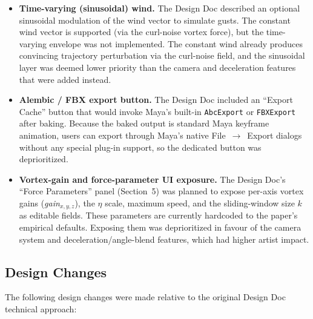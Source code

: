 \documentclass[12pt]{article}
\begin{document}
\begin{itemize}
  \item \textbf{Time-varying (sinusoidal) wind.} The Design Doc described an
    optional sinusoidal modulation of the wind vector to simulate gusts. The
    constant wind vector is supported (via the curl-noise vortex force), but
    the time-varying envelope was not implemented. The constant wind already
    produces convincing trajectory perturbation via the curl-noise field, and
    the sinusoidal layer was deemed lower priority than the camera and
    deceleration features that were added instead.

  \item \textbf{Alembic / FBX export button.} The Design Doc included an
    ``Export Cache'' button that would invoke Maya's built-in
    \texttt{AbcExport} or \texttt{FBXExport} after baking. Because the baked
    output is standard Maya keyframe animation, users can export through
    Maya's native File~$\to$~Export dialogs without any special plug-in
    support, so the dedicated button was deprioritized.

  \item \textbf{Vortex-gain and force-parameter UI exposure.} The Design Doc's
    ``Force Parameters'' panel (Section~5) was planned to expose per-axis
    vortex gains (\textit{gain}$_{x,y,z}$), the $\eta$ scale, maximum speed,
    and the sliding-window size $k$ as editable fields. These parameters are
    currently hardcoded to the paper's empirical defaults. Exposing them was
    deprioritized in favour of the camera system and deceleration/angle-blend
    features, which had higher artist impact.
\end{itemize}


\subsection{Design Changes}

The following design changes were made relative to the original Design Doc
technical approach:
\end{document}
